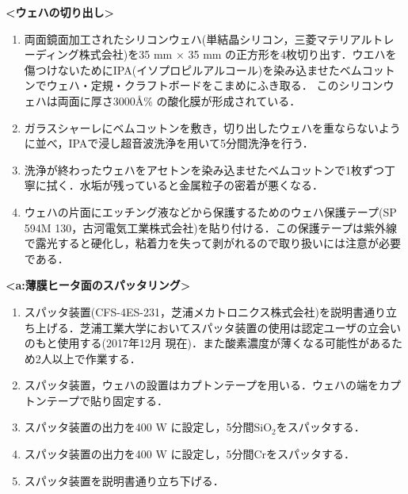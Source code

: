  \textbf{<ウェハの切り出し>}

\begin{enumerate}

\item 両面鏡面加工されたシリコンウェハ(単結晶シリコン，三菱マテリアルトレーディング株式会社)を35 mm × 35 mm の正方形を4枚切り出す．ウエハを傷つけないためにIPA(イソプロピルアルコール)を染み込ませたベムコットンでウェハ・定規・クラフトボードをこまめにふき取る．
このシリコンウェハは両面に厚さ3000\AA{}\% の酸化膜が形成されている．


\item ガラスシャーレにベムコットンを敷き，切り出したウェハを重ならないように並べ，IPAで浸し超音波洗浄を用いて5分間洗浄を行う．
 
\item 洗浄が終わったウェハをアセトンを染み込ませたベムコットンで1枚ずつ丁寧に拭く．水垢が残っていると金属粒子の密着が悪くなる．
 
\item ウェハの片面にエッチング液などから保護するためのウェハ保護テープ(SP 594M 130，古河電気工業株式会社)を貼り付ける．この保護テープは紫外線で露光すると硬化し，粘着力を失って剥がれるので取り扱いには注意が必要である．

\clearpage
\end{enumerate}

\newpage

\textbf{<a:薄膜ヒータ面のスパッタリング>}

\begin{enumerate}

\item スパッタ装置(CFS-4ES-231，芝浦メカトロニクス株式会社)を説明書通り立ち上げる．芝浦工業大学においてスパッタ装置の使用は認定ユーザの立会いのもと使用する(2017年12月 現在)．また酸素濃度が薄くなる可能性があるため2人以上で作業する．
 
\item スパッタ装置，ウェハの設置はカプトンテープを用いる．ウェハの端をカプトンテープで貼り固定する．

\item スパッタ装置の出力を400 W に設定し，5分間SiO$_{2}$をスパッタする．
\item スパッタ装置の出力を400 W に設定し，5分間Crをスパッタする．
\item スパッタ装置を説明書通り立ち下げる．
 \clearpage
\end{enumerate}
 
